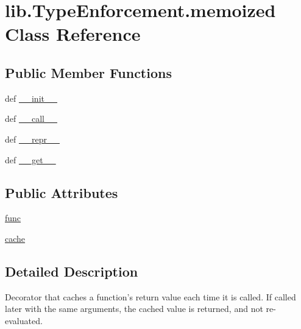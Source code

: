 \hypertarget{classlib_1_1_type_enforcement_1_1memoized}{\section{lib.\-Type\-Enforcement.\-memoized Class Reference}
\label{classlib_1_1_type_enforcement_1_1memoized}
}
\subsection*{Public Member Functions}
\begin{DoxyCompactItemize}
\item 
def \hyperlink{classlib_1_1_type_enforcement_1_1memoized_a1fb308af70d5cc3b73fb529811461d76}{\-\_\-\-\_\-init\-\_\-\-\_\-}
\item 
def \hyperlink{classlib_1_1_type_enforcement_1_1memoized_a3a7521dfe41bb54b9be6cf2c1af27a14}{\-\_\-\-\_\-call\-\_\-\-\_\-}
\item 
def \hyperlink{classlib_1_1_type_enforcement_1_1memoized_aa45b33d1e96f22ec1981ce1739b5b5ad}{\-\_\-\-\_\-repr\-\_\-\-\_\-}
\item 
def \hyperlink{classlib_1_1_type_enforcement_1_1memoized_ada22248779384f4d4a492a07498c0eab}{\-\_\-\-\_\-get\-\_\-\-\_\-}
\end{DoxyCompactItemize}
\subsection*{Public Attributes}
\begin{DoxyCompactItemize}
\item 
\hyperlink{classlib_1_1_type_enforcement_1_1memoized_a23ed1db05357f8380e209aaacccaba3d}{func}
\item 
\hyperlink{classlib_1_1_type_enforcement_1_1memoized_ae63e85bcde7d084f05df9b5e6625a3ca}{cache}
\end{DoxyCompactItemize}


\subsection{Detailed Description}
\begin{DoxyVerb}Decorator that caches a function's return value each time it is called.
If called later with the same arguments, the cached value is returned, and
not re-evaluated.
\end{DoxyVerb}
 

